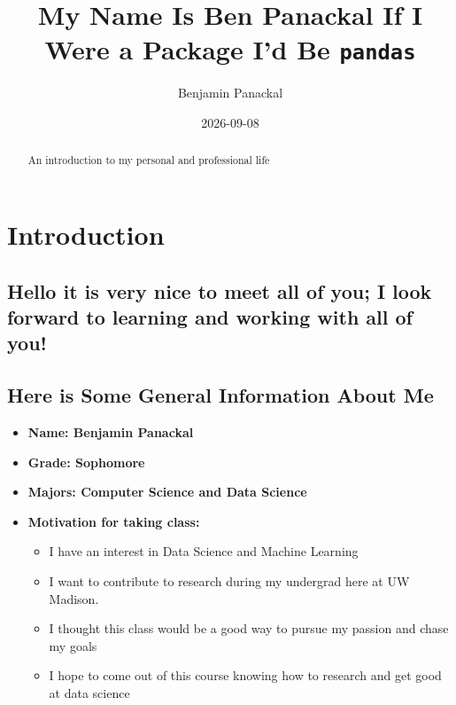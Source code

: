 \documentclass[
  letterpaper,
  DIV=11,
  numbers=noendperiod]{scrartcl}
\title{My Name Is Ben Panackal If I Were a Package I'd Be
\texttt{pandas}}
\author{Benjamin Panackal}
\date{2026-09-08}
\providecommand{\tightlist}{%
  \setlength{\itemsep}{0pt}\setlength{\parskip}{0pt}}
\renewcommand*\contentsname{Table of contents}
\newcommand\contentsname{Table of contents}
\begin{document}
\maketitle
\begin{abstract}
An introduction to my personal and professional life
\end{abstract}

\renewcommand*\contentsname{Table of contents}
{
\setcounter{tocdepth}{3}
\tableofcontents
}

\section{Introduction}\label{introduction}

\subsection{Hello it is very nice to meet all of you; I look forward to
learning and working with all of
you!}\label{hello-it-is-very-nice-to-meet-all-of-you-i-look-forward-to-learning-and-working-with-all-of-you}

\subsection{\texorpdfstring{\textbf{Here is Some General Information
About
Me}}{Here is Some General Information About Me}}\label{here-is-some-general-information-about-me}

\begin{itemize}
\tightlist
\item
  \textbf{Name: Benjamin Panackal}
\item
  \textbf{Grade: Sophomore}
\item
  \textbf{Majors: Computer Science and Data Science}
\item
  \textbf{Motivation for taking class:}

  \begin{itemize}
  \tightlist
  \item
    I have an interest in Data Science and Machine Learning
  \item
    I want to contribute to research during my undergrad here at UW
    Madison.
  \item
    I thought this class would be a good way to pursue my passion and
    chase my goals
  \item
    I hope to come out of this course knowing how to research and get
    good at data science
  \end{itemize}
\end{itemize}
\end{document}
